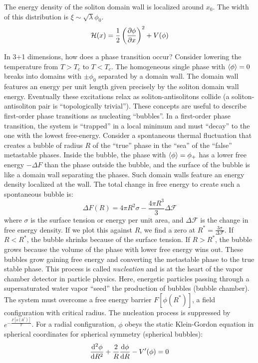 \documentclass[a4paper,twoside,master.tex]{subfiles}
\begin{document}
The energy density of the soliton domain wall is localized around $ x_0 $. The width of this distribution is $ \xi \sim \sqrt{\lambda} \phi_0 $. 
\begin{equation}
    \mathcal{H}(x) = \frac{1}{2} \left( \pdv{\phi}{x} \right)^2 + V(\phi)
\end{equation}

In 3+1 dimensions, how does a phase transition occur? Consider lowering the temperature from $ T > T_c $ to $ T < T_c $. The homogeneous single phase with $ \ev{\phi} = 0 $ breaks into domains with $ \pm \phi_0 $ separated by a domain wall. The domain wall features an energy per unit length given precisely by the soliton domain wall energy. Eventually these excitations relax as soliton-antisolitons collide (a soliton-antisoliton pair is ``topologically trivial''). These concepts are useful to describe first-order phase transitions as nucleating ``bubbles''. In a first-order phase transition, the system is ``trapped'' in a local minimum and must ``decay'' to the one with the lowest free-energy. Consider a spontaneous thermal fluctuation that creates a bubble of radius $ R $ of the ``true'' phase in the ``sea'' of the ``false'' metastable phases. Inside the bubble, the phase with $ \ev{\phi} = \phi_+ $ has a lower free energy $ - \Delta F $ than the phase outside the bubble, and the surface of the bubble is like a domain wall separating the phases. Such domain walls feature an energy density localized at the wall. The total change in free energy to create such a spontaneous bubble is:
\begin{equation}
    \Delta F(R) = 4 \pi R^2 \sigma - \frac{4 \pi R^3}{3} \Delta \mathcal{F}
\end{equation}
where $ \sigma $ is the surface tension or energy per unit area, and $ \Delta \mathcal{F} $ is the change in free energy density. If we plot this against $ R $, we find a zero at $ R^* = \frac{3 \sigma}{\Delta \mathcal{F}} $. If $ R < R^* $, the bubble shrinks because of the surface tension. If $ R > R^* $, the bubble grows because the volume of the phase with lower free energy wins out. These bubbles grow gaining free energy and converting the metastable phase to the true stable phase. This process is called \textit{nucleation} and is at the heart of the vapor chamber detector in particle physics. Here, energetic particles passing through a supersaturated water vapor ``seed'' the production of bubbles (bubble chamber). The system must overcome a free energy barrier $ F[\phi(R^*)] $, a field configuration with critical radius. The nucleation process is suppressed by $ e^{- \frac{F[\phi(R^*)]}{T}} $. For a radial configuration, $ \phi $ obeys the static Klein-Gordon equation in spherical coordinates for spherical symmetry (spherical bubbles):
\begin{equation}
    \dv[2]{\phi}{R} + \frac{2}{R} \dv{\phi}{R} - V'(\phi) = 0
\end{equation}
\end{document}
